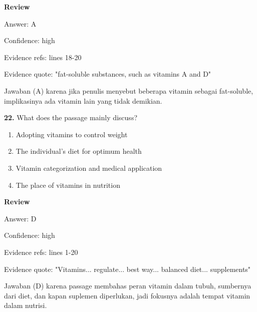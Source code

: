 \documentclass[12pt]{article}
\begin{document}
\setlength{\parindent}{0pt}
\textbf{Review}\par
Answer: A\par
Confidence: high\par
Evidence refs: lines 18-20\par
Evidence quote: "fat-soluble substances, such as vitamins A and D"\par
Jawaban (A) karena jika penulis menyebut beberapa vitamin sebagai fat-soluble, implikasinya ada vitamin lain yang tidak demikian.\par
\endgroup
\par
\vspace{0.25\baselineskip}
\noindent\textbf{22.} What does the passage mainly discuss?
\begin{enumerate}[label=(\Alph*),leftmargin=*,itemsep=0.2em]
\item Adopting vitamins to control weight
\item The individual's diet for optimum health
\item Vitamin categorization and medical application
\item The place of vitamins in nutrition
\end{enumerate}
\par
\begingroup
\setlength{\parskip}{0pt}
\setlength{\parindent}{0pt}
\textbf{Review}\par
Answer: D\par
Confidence: high\par
Evidence refs: lines 1-20\par
Evidence quote: "Vitamins... regulate... best way... balanced diet... supplements"\par
Jawaban (D) karena passage membahas peran vitamin dalam tubuh, sumbernya dari diet, dan kapan suplemen diperlukan, jadi fokusnya adalah tempat vitamin dalam nutrisi.\par
\endgroup
\par
\vspace{0.25\baselineskip}
\end{document}
